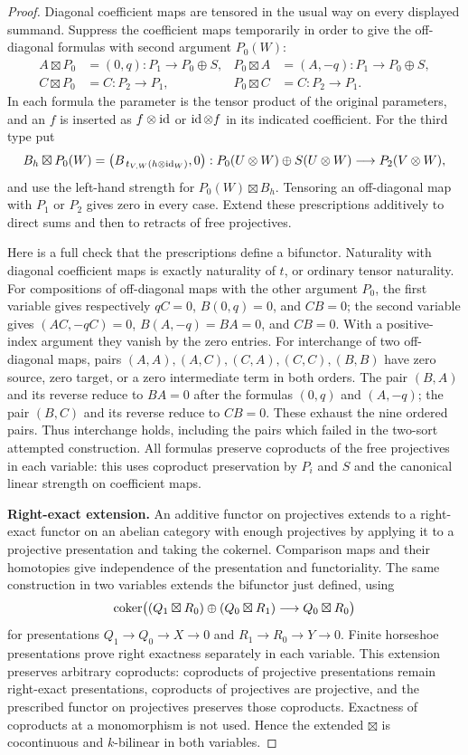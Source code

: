 \begin{proof}
Diagonal coefficient maps are tensored in the usual way on every displayed summand. Suppress the coefficient maps temporarily in order to give the off-diagonal formulas with second argument $P_0(W)$:
\begin{align*}
A\boxtimes P_0&=(0,q):P_1\longrightarrow P_0\oplus S,&
P_0\boxtimes A&=(A,-q):P_1\longrightarrow P_0\oplus S,\\
C\boxtimes P_0&=C:P_2\longrightarrow P_1,&
P_0\boxtimes C&=C:P_2\longrightarrow P_1.
\end{align*}
In each formula the parameter is the tensor product of the original parameters, and an $f$ is inserted as $f\otimes\operatorname{id}$ or $\operatorname{id}\otimes f$ in its indicated coefficient. For the third type put
\[
B_h\boxtimes P_0(W)=
\bigl(B_{\,t_{V,W}(h\otimes\operatorname{id}_W)},0\bigr):
P_0(U\otimes W)\oplus S(U\otimes W)\longrightarrow P_2(V\otimes W),
\]
and use the left-hand strength for $P_0(W)\boxtimes B_h$. Tensoring an off-diagonal map with $P_1$ or $P_2$ gives zero in every case. Extend these prescriptions additively to direct sums and then to retracts of free projectives.

Here is a full check that the prescriptions define a bifunctor. Naturality with diagonal coefficient maps is exactly naturality of $t$, or ordinary tensor naturality. For compositions of off-diagonal maps with the other argument $P_0$, the first variable gives respectively $qC=0$, $B(0,q)=0$, and $CB=0$; the second variable gives $(AC,-qC)=0$, $B(A,-q)=BA=0$, and $CB=0$. With a positive-index argument they vanish by the zero entries. For interchange of two off-diagonal maps, pairs $(A,A),(A,C),(C,A),(C,C),(B,B)$ have zero source, zero target, or a zero intermediate term in both orders. The pair $(B,A)$ and its reverse reduce to $BA=0$ after the formulas $(0,q)$ and $(A,-q)$; the pair $(B,C)$ and its reverse reduce to $CB=0$. These exhaust the nine ordered pairs. Thus interchange holds, including the pairs which failed in the two-sort attempted construction. All formulas preserve coproducts of the free projectives in each variable: this uses coproduct preservation by $P_i$ and $S$ and the canonical linear strength on coefficient maps.

\textbf{Right-exact extension.}
An additive functor on projectives extends to a right-exact functor on an abelian category with enough projectives by applying it to a projective presentation and taking the cokernel. Comparison maps and their homotopies give independence of the presentation and functoriality. The same construction in two variables extends the bifunctor just defined, using
\[
\operatorname{coker}\bigl((Q_1\boxtimes R_0)\oplus(Q_0\boxtimes R_1)
\longrightarrow Q_0\boxtimes R_0\bigr)
\]
for presentations $Q_1\to Q_0\to X\to0$ and $R_1\to R_0\to Y\to0$. Finite horseshoe presentations prove right exactness separately in each variable. This extension preserves arbitrary coproducts: coproducts of projective presentations remain right-exact presentations, coproducts of projectives are projective, and the prescribed functor on projectives preserves those coproducts. Exactness of coproducts at a monomorphism is not used. Hence the extended $\boxtimes$ is cocontinuous and $k$-bilinear in both variables.


\end{proof}
